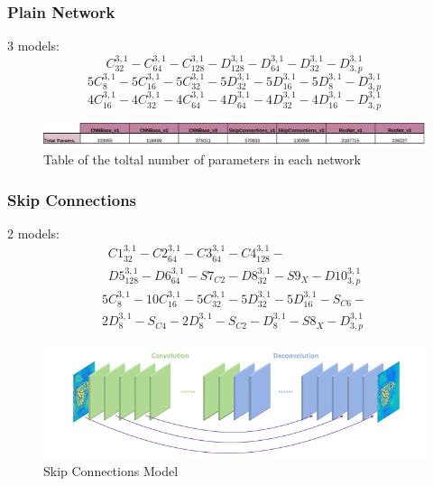\documentclass [handout] {beamer}
\begin{document}
\begin{frame}
	\frametitle{Plain Network}
	3 models:
	\begin{equation}
		C_{32}^{3,1} - C_{64}^{3,1} - C_{128}^{3,1} - D_{128}^{3,1} - D_{64}^{3,1} - D_{32}^{3,1} - D_{3,p}^{3,1} 
		\label{CNNbase_v1}
	\end{equation}
	\medskip
	\begin{equation}
		5C_{8}^{3,1} - 5C_{16}^{3,1} - 5C_{32}^{3,1} - 5D_{32}^{3,1} - 5D_{16}^{3,1} - 5D_{8}^{3,1} - D_{3,p}^{3,1} 
		\label{CNNbase_v2}
	\end{equation}
	\medskip
	\begin{equation}
		4C_{16}^{3,1} - 4C_{32}^{3,1} - 4C_{64}^{3,1} - 4D_{64}^{3,1} - 4D_{32}^{3,1} - 4D_{16}^{3,1} - D_{3,p}^{3,1} 
		\label{CNNbase_v2}
	\end{equation}
	\begin{figure}[hbtp]
		\centering
		\includegraphics[scale=0.35]{../params_table.png}
		\caption{Table of the toltal number of parameters in each network}\label{table_params}
	\end{figure}
\end{frame}

\begin{frame}
	\frametitle{Skip Connections}
	2 models:
	\begin{equation}
	\begin{split}
		C1_{32}^{3,1} - C2_{64}^{3,1} - C3_{64}^{3,1} - C4_{128}^{3,1} - \\ D5_{128}^{3,1} - D6_{64}^{3,1} - S7_{C2} - D8_{32}^{3,1} - S9_X - D10_{3,p}^{3,1} 
	\end{split}
	\end{equation}
	\medskip
	\begin{equation}
	\begin{split}
		5C_{8}^{3,1} - 10C_{16}^{3,1} - 5C_{32}^{3,1} - 5D_{32}^{3,1} - 5D_{16}^{3,1} - S_{C6} - \\ 2D_{8}^{3,1} - S_{C4} - 2D_{8}^{3,1} - S_{C2} -D_{8}^{3,1} - S8_X - D_{3,p}^{3,1} 
	\end{split}
	\end{equation}
	\begin{figure}[hbtp]
		\centering
		\includegraphics[scale=0.35]{skipconnections_model.png}
		\caption{Skip Connections Model}\label{skips_model}
	\end{figure}
\end{frame}
\end{document}
